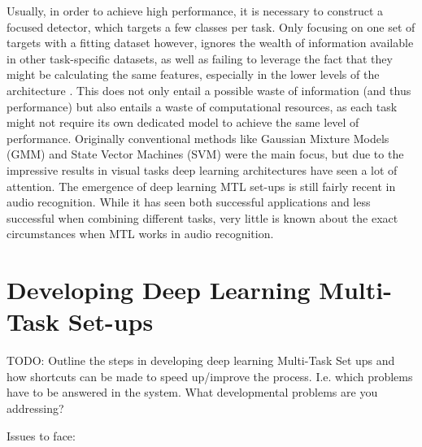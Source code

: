 Usually, in order to achieve high performance, it is necessary to construct a focused detector, which targets a few classes per task. Only focusing on one set of targets with a fitting dataset however, ignores the wealth of information available in other task-specific datasets, as well as failing to leverage the fact that they might be calculating the same features, especially in the lower levels of the architecture \citep{tagliasacchi2020multi}. This does not only entail a possible waste of information (and thus performance) but also entails a waste of computational resources, as each task might not require its own dedicated model to achieve the same level of performance. Originally conventional methods like Gaussian Mixture Models (GMM) and State Vector Machines (SVM) were the main focus, but due to the impressive results in visual tasks deep learning architectures have seen a lot of attention.  The emergence of deep learning MTL set-ups is still fairly recent in audio recognition. While it has seen both successful \citep{tonami2019joint} applications and less successful \citep{sakti2016deep} when combining different tasks, very little is known about the exact circumstances when MTL works in audio recognition.\\

\section{Developing Deep Learning Multi-Task Set-ups}
TODO: Outline the steps in developing deep learning Multi-Task Set ups and how shortcuts can be made to speed up/improve the process. I.e. which problems have to be answered in the system. What developmental problems are you addressing?

Issues to face:

